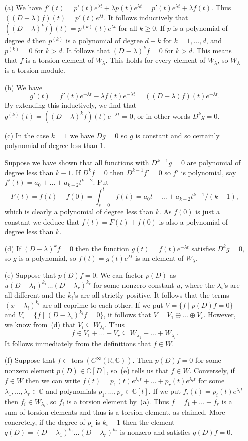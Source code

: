 \documentclass{amsart}
\newcommand{\tors}      {\operatorname{tors}}
\newcommand{\C}         {{\mathbb{C}}}
\newcommand{\R}         {{\mathbb{R}}}
\newcommand{\lm}        {\lambda}
\newcommand{\sse}       {\subseteq}
\newcommand{\CRC}       {C^\infty(\R,\C)}
\newcommand{\st}        {\;|\;}
\newcommand{\op}        {\oplus}
\renewcommand{\:}{\colon}
\theoremstyle{definition}
\renewenvironment{solution}{\SolutionAtEnd}{\endSolutionAtEnd}
\begin{document}
\begin{solution}
 \begin{itemize}
  \item[(a)] We have
   $f'(t)=p'(t)e^{\lm t}+\lm p(t)e^{\lm t}=p'(t)e^{\lm t}+\lm f(t)$.
   Thus $((D-\lm)f)(t)=p'(t)e^{\lm t}$.  It follows inductively that
   $((D-\lm)^kf)(t)=p^{(k)}(t)e^{\lm t}$ for all $k\geq 0$.  If $p$ is
   a polynomial of degree $d$ then $p^{(k)}$ is a polynomial of degree
   $d-k$ for $k=1,\ldots,d$, and $p^{(k)}=0$ for $k>d$.  It follows
   that $(D-\lm)^kf=0$ for $k>d$.  This means that $f$ is a torsion
   element of $W_\lm$.  This holds for every element of $W_\lm$, so
   $W_\lm$ is a torsion module.
  \item[(b)] We have
   \[ g'(t)=f'(t)e^{-\lm t}-\lm f(t)e^{-\lm t}=((D-\lm)f)(t)e^{-\lm t}.
   \]
   By extending this inductively, we find that
   $g^{(k)}(t)=((D-\lm)^kf)(t)e^{-\lm t}=0$, or in other words
   $D^kg=0$.
  \item[(c)] In the case $k=1$ we have $Dg=0$ so $g$ is constant and
   so certainly polynomial of degree less than $1$.

   Suppose we have shown that all functions with $D^{k-1}g=0$ are
   polynomial of degree less than $k-1$.  If $D^kf=0$ then
   $D^{k-1}f'=0$ so $f'$ is polynomial, say
   $f'(t)=a_0+\ldots+a_{k-2}t^{k-2}$.  Put 
   \[ F(t)=f(t)-f(0)=\int_{s=0}^t f(t) = 
       a_0t+\ldots+a_{k-2}t^{k-1}/(k-1),
   \]
   which is clearly a polynomial of degree less than $k$.  As $f(0)$
   is just a constant we deduce that $f(t)=F(t)+f(0)$ is also a
   polynomial of degree less than $k$.
  \item[(d)] If $(D-\lm)^kf=0$ then the function $g(t)=f(t)e^{-\lm t}$
   satisfies $D^kg=0$, so $g$ is a polynomial, so $f(t)=g(t)e^{\lm t}$
   is an element of $W_\lm$.
  \item[(e)] Suppose that $p(D)f=0$.  We can factor $p(D)$ as
   $u(D-\lm_1)^{k_1}\ldots(D-\lm_r)^{k_r}$ for some nonzero constant
   $u$, where the $\lm_i$'s are all different and the $k_i$'s are all
   strictly positive.  It follows that the terms $(x-\lm_i)^{k_i}$ are
   all coprime to each other.  If we put $V=\{f\st p(D)f=0\}$ and
   $V_i=\{f\st (D-\lm_i)^{k_i}f=0\}$, it follows that
   $V=V_1\op\ldots\op V_r$.  However, we know from~(d) that
   $V_i\sse W_{\lm_i}$.  Thus
   \[ f \in V_1 + \ldots + V_r \sse W_{\lm_1} + \ldots + W_{\lm_r}. \]
   It follows immediately from the definitions that $f\in W$.
  \item[(f)] Suppose that $f\in\tors(\CRC)$.  Then $p(D)f=0$ for some
   nonzero element $p(D)\in\C[D]$, so~(e) tells us that $f\in W$.
   Conversely, if $f\in W$ then we can write
   $f(t)=p_1(t)e^{\lm_1t}+\ldots+p_r(t)e^{\lm_rt}$ for some
   $\lm_1,\ldots,\lm_r\in\C$ and polynomials
   $p_1,\ldots,p_r\in\C[t]$.  If we put $f_i(t)=p_i(t)e^{\lm_it}$ then
   $f_i\in W_{\lm_i}$, so $f_i$ is a torsion element by~(a).  Thus
   $f=f_1+\ldots+f_r$ is a sum of torsion elements and thus is a
   torsion element, as claimed.  More concretely, if the degree of
   $p_i$ is $k_i-1$ then the element
   $q(D)=(D-\lm_1)^{k_1}\ldots(D-\lm_r)^{k_r}$ is nonzero and
   satisfies $q(D)f=0$. 
 \end{itemize}
\end{solution}
\end{document}

